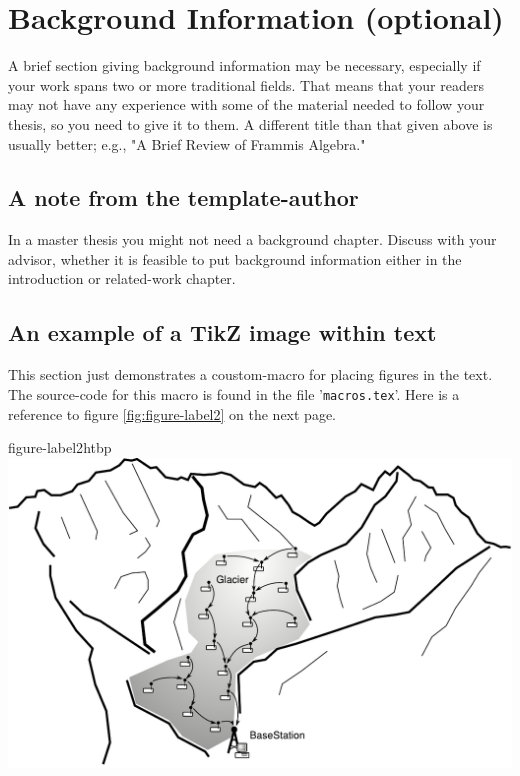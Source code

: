 \chapter{Background Information (optional)}
\label{chap:background}
A brief section giving background information may be necessary, especially if
your work spans two or more traditional fields. That means that your readers
may not have any experience with some of the material needed to follow your
thesis, so you need to give it to them. A different title than that given
above is usually better; e.g., "A Brief Review of Frammis Algebra." 

\section{A note from the template-author}
In a master thesis you might not need a background chapter. Discuss with your
advisor, whether it is feasible to put background information either in the
introduction or related-work chapter.

\section{An example of a TikZ image within text}
This section just demonstrates a coustom-macro for placing figures in the
text. The source-code for this macro is found in the file '\texttt{macros.tex}'.
Here is a reference to figure \ref{fig:figure-label2} on the next page.

\Blindtext

%
{figure-label2}{htbp}{%
    \includegraphics[width=0.8\linewidth]{img/Glacier.pdf}
}

\blindtext
\blinditemize

